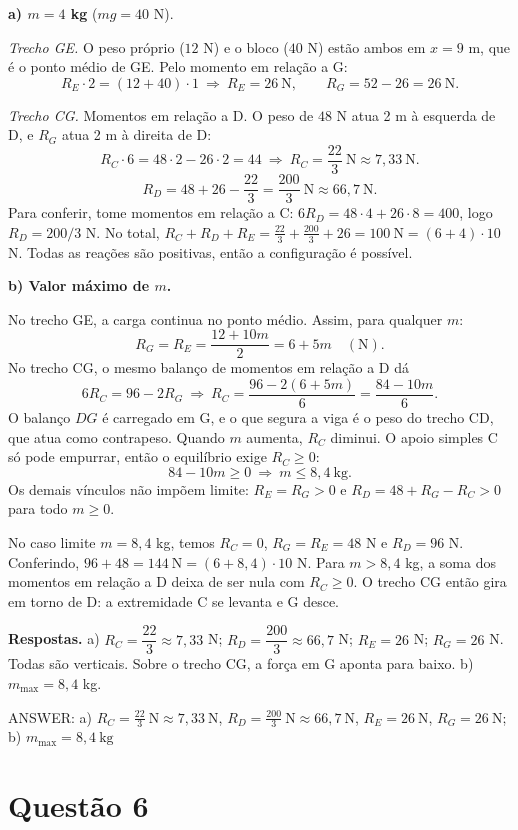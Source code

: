 \documentclass{article}%
\begin{document}
\textbf{a) $m=4$ kg} ($mg=40$ N).

\emph{Trecho GE.} O peso próprio ($12$ N) e o bloco ($40$ N) estão ambos em $x=9$ m, que é o ponto médio de GE. Pelo momento em relação a G:
\[
R_E\cdot 2=(12+40)\cdot 1\ \Rightarrow\ R_E=26\ \text{N},\qquad R_G=52-26=26\ \text{N}.
\]

\emph{Trecho CG.} Momentos em relação a D. O peso de $48$ N atua 2 m à esquerda de D, e $R_G$ atua 2 m à direita de D:
\[
R_C\cdot 6=48\cdot 2-26\cdot 2=44\ \Rightarrow\ R_C=\frac{22}{3}\ \text{N}\approx 7{,}33\ \text{N}.
\]
\[
R_D=48+26-\frac{22}{3}=\frac{200}{3}\ \text{N}\approx 66{,}7\ \text{N}.
\]
Para conferir, tome momentos em relação a C: $6R_D=48\cdot 4+26\cdot 8=400$, logo $R_D=200/3$ N. No total, $R_C+R_D+R_E=\frac{22}{3}+\frac{200}{3}+26=100\ \text{N}=(6+4)\cdot 10$ N. Todas as reações são positivas, então a configuração é possível.

\textbf{b) Valor máximo de $m$.}

No trecho GE, a carga continua no ponto médio. Assim, para qualquer $m$:
\[
R_G=R_E=\frac{12+10m}{2}=6+5m\quad(\text{N}).
\]
No trecho CG, o mesmo balanço de momentos em relação a D dá
\[
6R_C=96-2R_G\ \Rightarrow\ R_C=\frac{96-2(6+5m)}{6}=\frac{84-10m}{6}.
\]
O balanço $DG$ é carregado em G, e o que segura a viga é o peso do trecho CD, que atua como contrapeso. Quando $m$ aumenta, $R_C$ diminui. O apoio simples C só pode empurrar, então o equilíbrio exige $R_C\ge 0$:
\[
84-10m\ge 0\ \Rightarrow\ m\le 8{,}4\ \text{kg}.
\]
Os demais vínculos não impõem limite: $R_E=R_G>0$ e $R_D=48+R_G-R_C>0$ para todo $m\ge 0$.

No caso limite $m=8{,}4$ kg, temos $R_C=0$, $R_G=R_E=48$ N e $R_D=96$ N. Conferindo, $96+48=144\ \text{N}=(6+8{,}4)\cdot 10$ N. Para $m>8{,}4$ kg, a soma dos momentos em relação a D deixa de ser nula com $R_C\ge 0$. O trecho CG então gira em torno de D: a extremidade C se levanta e G desce.

\textbf{Respostas.} a) $R_C=\dfrac{22}{3}\approx 7{,}33$ N; $R_D=\dfrac{200}{3}\approx 66{,}7$ N; $R_E=26$ N; $R_G=26$ N. Todas são verticais. Sobre o trecho CG, a força em G aponta para baixo. b) $m_{\max}=8{,}4$ kg.

ANSWER: a) $R_C=\frac{22}{3}\ \text{N}\approx 7{,}33\ \text{N}$, $R_D=\frac{200}{3}\ \text{N}\approx 66{,}7\ \text{N}$, $R_E=26\ \text{N}$, $R_G=26\ \text{N}$; b) $m_{\max}=8{,}4\ \text{kg}$%
\newpage%
\section*{Questão 6}
\end{document}
